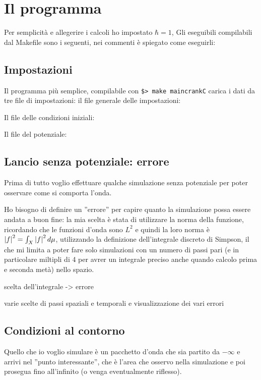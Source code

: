 \section{Il programma}
Per semplicit\`a e allegerire i calcoli ho impostato $\hbar=1$, 
Gli eseguibili compilabili dal Makefile sono i seguenti, nei commenti \`e spiegato come eseguirli:

\subsection{Impostazioni}
Il programma pi\`u semplice, compilabile con \lstinline|$> make maincrankC| carica i dati da tre file di impostazioni:
il file generale delle impostazioni:

Il file delle condizioni iniziali:

Il file del potenziale:

\subsection{Lancio senza potenziale: errore}
Prima di tutto voglio effettuare qualche simulazione senza potenziale per poter osservare come si comporta l'onda.

Ho bisogno di definire un ''errore'' per capire quanto la simulazione possa essere andata a buon fine:
la mia scelta \`e stata di utilizzare la norma della funzione, ricordando che le funzioni d'onda sono $L^2$ e quindi la loro norma \`e  $\lr||f^2=\int_X\lr||f^2d\mu$, utilizzando la definizione dell'integrale discreto di Simpson, il che mi limita a poter fare solo simulazioni con un numero di passi pari (e in particolare miltipli di 4 per avrer un integrale preciso anche quando calcolo prima e seconda met\`a) nello spazio.

scelta dell'integrale -> errore

varie scelte di passi spaziali e temporali e visualizzazione dei vari errori

\subsection{Condizioni al contorno}
Quello che io voglio simulare \`e un pacchetto d'onda che sia partito da $-\infty$ e arrivi nel ''punto interessante'', che \`e l'area che osservo nella simulazione e poi prosegua fino all'infinito (o venga eventualmente riflesso).

